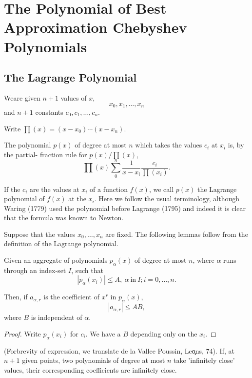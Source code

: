 \chapter[The Polynomial of Best Approximation...]{The Polynomial of Best Approximation Chebyshev
  Polynomials}\label{chap2} 

\setcounter{section}{3}
\section{The Lagrange Polynomial}\label{chap2:sec4}

We\pageoriginale are given $n +1$ values of $x$,
 $$
 x_0, x_1, \ldots, x_n 
 $$
 and $ n + 1 $ constants $ c_0, c_1, \ldots,  c_n$.

Write $ \prod (x)  = (x - x_0)  \cdots (x - x_n) $.

The polynomial $p(x)$ of degree at most $n$ which takes the values
$c_i$ at $x_i$ is, by the partial- fraction rule for $ p (x) /
\prod(x) $, 
$$
\prod (x) \sum^{n}_{0} \frac{1}{x - x_i} \frac{c_i}{\prod (x_i)}.
$$

If the $c_i $  are the values at $x_i$  of a function $ f (x) $, we
call $ p (x) $ the Lagrange polynomial of $ f (x) $ at the $x_i
$. Here we follow the usual terminology, although Waring (1779)
used the polynomial before Lagrange (1795) and indeed it is clear
that the formula was known to  Newton. 

Suppose that the values $ x_0,  \ldots,  x_n $ are fixed. The
following lemmas follow from the definition of the Lagrange
polynomial. 

\begin{lem}\label{chap2:sec4:lem1}%
  Given an aggregate of  polynomials $p_\alpha (x) $ of  degree at
  most $n$, where $ \alpha $ runs through an index-set $ I $, such
  that  
  $$
  | p_\alpha (x_i) | \leq A,  ~\alpha ~\text{in}~ I ; i = 0, \ldots,  n.
  $$
\end{lem}

Then, if $ a_{\alpha, r} $ is the coefficient of $ x^r $ in $ p_\alpha (x) $, 
$$
| a_{\alpha, r} | \leq A B, 
$$
where $B$ is independent of $ \alpha $.

\begin{proof}
  Write $ p_\alpha (x_i) $ for $c_i$. We have a $B$ depending only
  on the $x_i$. 
\end{proof}

\begin{lem}\label{chap2:sec4:lem2}%
  (For\pageoriginale brevity of expression, we translate de la Vallee Poussin,
  Le\c ons, 74). If, at $ n + 1 $  given points, two polynomials of
  degree at most $n$  take 'infinitely close' values, their
  corresponding  coefficients are infinitely close. 
\end{lem}

